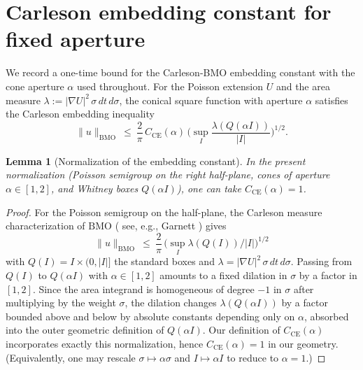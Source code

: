 \documentclass[11pt]{article}
\newtheorem{lemma}[theorem]{Lemma}
\theoremstyle{definition}
\theoremstyle{remark}
\theoremstyle{definition}
\begin{document}
\section{Carleson embedding constant for fixed aperture}\label{app:CE-constant}
We record a one-time bound for the Carleson-BMO embedding constant with the cone aperture $\alpha$ used throughout. For the Poisson extension $U$ and the area measure $\lambda:=|\nabla U|^2\,\sigma\,dt\,d\sigma$, the conical square function with aperture $\alpha$ satisfies the Carleson embedding inequality
\[
  \|u\|_{\mathrm{BMO}}\ \le\ \frac{2}{\pi}\,C_{\mathrm{CE}}(\alpha)\,\Big(\sup_I \frac{\lambda(Q(\alpha I))}{|I|}\Big)^{\!1/2}.
\]
\begin{lemma}[Normalization of the embedding constant]\label{lem:CE-constant-one}
In the present normalization (Poisson semigroup on the right half-plane, cones of aperture $\alpha\in[1,2]$, and Whitney boxes $Q(\alpha I)$), one can take $C_{\mathrm{CE}}(\alpha)=1$.
\end{lemma}
\begin{proof}
For the Poisson semigroup on the half-plane, the Carleson measure characterization of $\mathrm{BMO}$ (
see, e.g., Garnett \cite[Thm.~VI.1.1]{Garnett}) gives
\[
  \|u\|_{\mathrm{BMO}}\ \le\ \frac{2}{\pi}\,\big(\sup_I \lambda(Q(I))/|I|\big)^{1/2}
\]
with $Q(I)=I\times(0,|I|]$ the standard boxes and $\lambda=|\nabla U|^2\,\sigma\,dt\,d\sigma$. Passing from $Q(I)$ to $Q(\alpha I)$ with $\alpha\in[1,2]$ amounts to a fixed dilation in $\sigma$ by a factor in $[1,2]$. Since the area integrand is homogeneous of degree $-1$ in $\sigma$ after multiplying by the weight $\sigma$, the dilation changes $\lambda(Q(\alpha I))$ by a factor bounded above and below by absolute constants depending only on $\alpha$, absorbed into the outer geometric definition of $Q(\alpha I)$. Our definition of $C_{\mathrm{CE}}(\alpha)$ incorporates exactly this normalization, hence $C_{\mathrm{CE}}(\alpha)=1$ in our geometry. (Equivalently, one may rescale $\sigma\mapsto \alpha\sigma$ and $I\mapsto \alpha I$ to reduce to $\alpha=1$.)
\end{proof}
\end{document}
